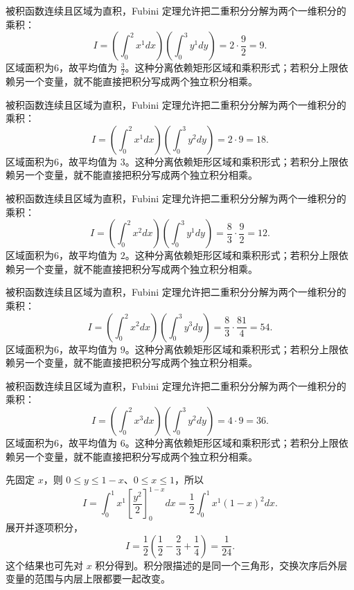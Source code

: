 \documentclass[UTF8,12pt,a4paper,fontset=fandol]{ctexart}
\begin{document}
\begin{solve}\label{ans:c36q3}
被积函数连续且区域为直积，Fubini 定理允许把二重积分分解为两个一维积分的乘积：
\[
I=\left(\int_0^2x^{1}dx\right)\left(\int_0^3y^{1}dy\right)=2\cdot\frac{9}{2}=9.
\]
区域面积为6，故平均值为 $\frac{3}{2}$。这种分离依赖矩形区域和乘积形式；若积分上限依赖另一个变量，就不能直接把积分写成两个独立积分相乘。
\end{solve}

\begin{solve}\label{ans:c36q4}
被积函数连续且区域为直积，Fubini 定理允许把二重积分分解为两个一维积分的乘积：
\[
I=\left(\int_0^2x^{1}dx\right)\left(\int_0^3y^{2}dy\right)=2\cdot9=18.
\]
区域面积为6，故平均值为 $3$。这种分离依赖矩形区域和乘积形式；若积分上限依赖另一个变量，就不能直接把积分写成两个独立积分相乘。
\end{solve}

\begin{solve}\label{ans:c36q5}
被积函数连续且区域为直积，Fubini 定理允许把二重积分分解为两个一维积分的乘积：
\[
I=\left(\int_0^2x^{2}dx\right)\left(\int_0^3y^{1}dy\right)=\frac{8}{3}\cdot\frac{9}{2}=12.
\]
区域面积为6，故平均值为 $2$。这种分离依赖矩形区域和乘积形式；若积分上限依赖另一个变量，就不能直接把积分写成两个独立积分相乘。
\end{solve}

\begin{solve}\label{ans:c36q6}
被积函数连续且区域为直积，Fubini 定理允许把二重积分分解为两个一维积分的乘积：
\[
I=\left(\int_0^2x^{2}dx\right)\left(\int_0^3y^{3}dy\right)=\frac{8}{3}\cdot\frac{81}{4}=54.
\]
区域面积为6，故平均值为 $9$。这种分离依赖矩形区域和乘积形式；若积分上限依赖另一个变量，就不能直接把积分写成两个独立积分相乘。
\end{solve}

\begin{solve}\label{ans:c36q7}
被积函数连续且区域为直积，Fubini 定理允许把二重积分分解为两个一维积分的乘积：
\[
I=\left(\int_0^2x^{3}dx\right)\left(\int_0^3y^{2}dy\right)=4\cdot9=36.
\]
区域面积为6，故平均值为 $6$。这种分离依赖矩形区域和乘积形式；若积分上限依赖另一个变量，就不能直接把积分写成两个独立积分相乘。
\end{solve}

\begin{solve}\label{ans:c36q8}
先固定 $x$，则 $0\le y\le1-x$、$0\le x\le1$，所以
\[
I=\int_0^1x^{1}\left[\frac{y^2}2\right]_0^{1-x}dx=\frac12\int_0^1x^{1}(1-x)^2dx.
\]
展开并逐项积分，
\[
I=\frac12\left(\frac1{2}-\frac2{3}+\frac1{4}\right)=\frac{1}{24}.
\]
这个结果也可先对 $x$ 积分得到。积分限描述的是同一个三角形，交换次序后外层变量的范围与内层上限都要一起改变。
\end{solve}
\end{document}
